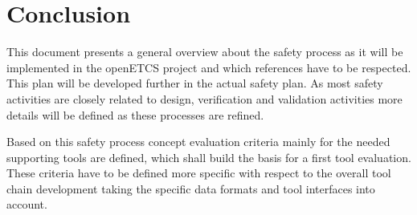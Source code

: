 \documentclass{template/openetcs_article}
\begin{document}
\section{Conclusion}

This document presents a general overview about the safety process as it will be implemented in the openETCS project and which references have to be respected. This plan will be developed further in the actual safety plan. As most safety activities are closely related to design, verification and validation activities more details will be defined as these processes are refined.

Based on this safety process concept evaluation criteria mainly for the needed supporting tools are defined, which shall build the basis for a first tool evaluation. These criteria have to be defined more specific with respect to the overall tool chain development taking the specific data formats and tool interfaces into account.

\nocite{*} 






\end{document}

